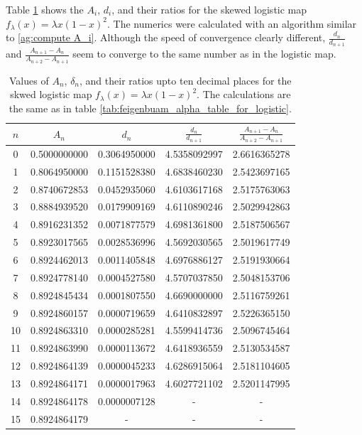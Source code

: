 Table \ref{tab:feigenbuam_constants_skewed_logistic_map} shows the $A_i$, $d_i$, and their ratios for the skewed logistic map $f_{\lambda} (x) = \lambda x (1-x)^2$.
The numerics were calculated with an algorithm similar to \ref{ag:compute A_i}.
Although the speed of convergence clearly different, 
$ \frac{d_n}{d_{n+1}} $ and $\frac{A_{n+1} - A_n}{A_{n+2} - A_{n+1}}$ seem to converge to the same number as in the logistic map.
\begin{table}
\centering
\begin{tabular}{|c|c|c|c|c|}
\hline
\( n \) & \( A_n \) & \( d_n \) &  \(\frac{d_n}{d_{n+1}}\) & \(\frac{A_{n+1} - A_n}{A_{n+2} - A_{n+1}}\)  \\ \hline
0 & 0.5000000000 & 0.3064950000 & 4.5358092997 & 2.6616365278 \\
1 & 0.8064950000 & 0.1151528380 & 4.6838460230 & 2.5423697165 \\
2 & 0.8740672853 & 0.0452935060 & 4.6103617168 & 2.5175763063 \\
3 & 0.8884939520 & 0.0179909169 & 4.6110890246 & 2.5029942863 \\
4 & 0.8916231352 & 0.0071877579 & 4.6981361800 & 2.5187506567 \\
5 & 0.8923017565 & 0.0028536996 & 4.5692030565 & 2.5019617749 \\
6 & 0.8924462013 & 0.0011405848 & 4.6976886127 & 2.5191930664 \\
7 & 0.8924778140 & 0.0004527580 & 4.5707037850 & 2.5048153706 \\
8 & 0.8924845434 & 0.0001807550 & 4.6690000000 & 2.5116759261 \\
9 & 0.8924860157 & 0.0000719659 & 4.6410832897 & 2.5226365150 \\
10 & 0.8924863310 & 0.0000285281 & 4.5599414736 & 2.5096745464 \\
11 & 0.8924863990 & 0.0000113672 & 4.6418936559 & 2.5130534587 \\
12 & 0.8924864139 & 0.0000045233 & 4.6286915064 & 2.5181104605 \\
13 & 0.8924864171 & 0.0000017963 & 4.6027721102 & 2.5201147995 \\
14 & 0.8924864178 & 0.0000007128 &  - &  - \\
15 & 0.8924864179 &  - &  - &  - \\
\hline
\end{tabular}
\caption{
	Values of \( A_n \), \( \delta_n \), and their ratios upto ten decimal places for the skwed logistic map $f_{\lambda}(x) = \lambda x(1-x)^2$.
	The calculations are the same as in table \ref{tab:feigenbuam_alpha_table_for_logistic}.
}
\label{tab:feigenbuam_constants_skewed_logistic_map}
\end{table}


